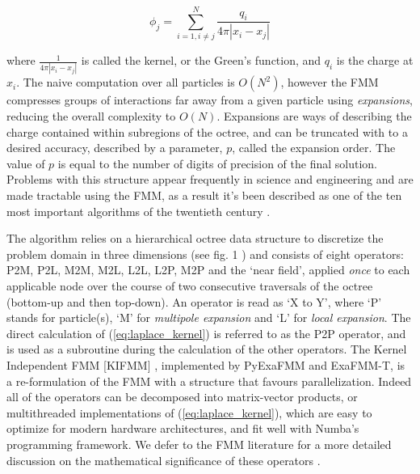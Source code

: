 \documentclass{IEEEcsmag}
\begin{document}
\begin{equation}
    \phi_j = \sum_{i=1, i \neq j}^{N} \frac{q_i}{4 \pi| x_i-x_j |}
    \label{eq:laplace_kernel}
\end{equation}

where $\frac{1}{4 \pi| x_i-x_j|}$ is called the kernel, or the Green's function, and $q_i$ is the charge at $x_i$. The naive computation over all particles is $O(N^2)$, however the FMM compresses groups of interactions far away from a given particle using \textit{expansions}, reducing the overall complexity to $O(N)$. Expansions are ways of describing the charge contained within subregions of the octree, and can be truncated with to a desired accuracy, described by a parameter, $p$, called the expansion order. The value of $p$ is equal to the number of digits of precision of the final solution. Problems with this structure appear frequently in science and engineering and are made tractable using the FMM, as a result it's been described as one of the ten most important algorithms of the twentieth century \cite{Cipra2000}.

The algorithm relies on a hierarchical octree data structure to discretize the problem domain in three dimensions (see fig. 1 \cite{Sundar2007}) and consists of eight operators: P2M, P2L, M2M, M2L, L2L, L2P, M2P and the `near field', applied \textit{once} to each applicable node over the course of two consecutive traversals of the octree (bottom-up and then top-down). An operator is read as `X to Y', where `P' stands for particle(s), `M' for \textit{multipole expansion} and `L' for \textit{local expansion}. The direct calculation of (\ref{eq:laplace_kernel}) is referred to as the P2P operator, and is used as a subroutine during the calculation of the other operators. The Kernel Independent FMM [KIFMM] \cite{Ying2004}, implemented by PyExaFMM and ExaFMM-T, is a re-formulation of the FMM with a structure that favours parallelization. Indeed all of the operators can be decomposed into matrix-vector products, or multithreaded implementations of (\ref{eq:laplace_kernel}), which are easy to optimize for modern hardware architectures, and fit well with Numba's programming framework. We defer to the FMM literature for a more detailed discussion on the mathematical significance of these operators \cite{Ying2004,Greengard1987}.
\end{document}
